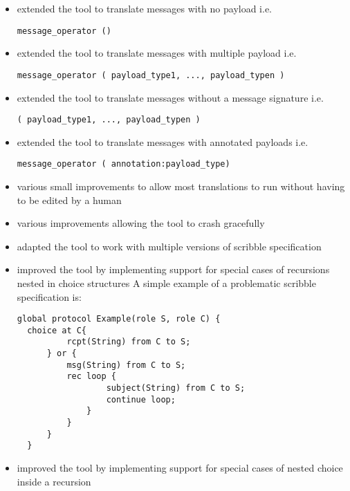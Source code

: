\begin{itemize}
\item extended the tool to translate messages with no payload i.e.
\begin{lstlisting}[basicstyle=\footnotesize]
  message_operator ()
\end{lstlisting}
\item extended the tool to translate messages with multiple payload i.e.
\begin{lstlisting}[basicstyle=\footnotesize]
  message_operator ( payload_type1, ..., payload_typen )
\end{lstlisting}
\item extended the tool to translate messages without a message signature i.e.
\begin{lstlisting}[basicstyle=\footnotesize]
  ( payload_type1, ..., payload_typen )
\end{lstlisting}
\item extended the tool to translate messages with annotated payloads i.e.
\begin{lstlisting}[basicstyle=\footnotesize]
  message_operator ( annotation:payload_type)
\end{lstlisting}
\item various small improvements to allow most translations to run without having to be edited by a human
\item various improvements allowing the tool to crash gracefully
\item adapted the tool to work with multiple versions of scribble specification
\item improved the tool by implementing support for special cases of recursions nested in choice structures
A simple example of a problematic scribble specification is:
\begin{lstlisting}[basicstyle=\footnotesize]
  global protocol Example(role S, role C) {
  choice at C{
          rcpt(String) from C to S;
      } or {
          msg(String) from C to S;
          rec loop {
                  subject(String) from C to S;
                  continue loop;
              }
          }
      }
  }
\end{lstlisting}
\item improved the tool by implementing support for special cases of nested choice inside a recursion


\end{itemize}
